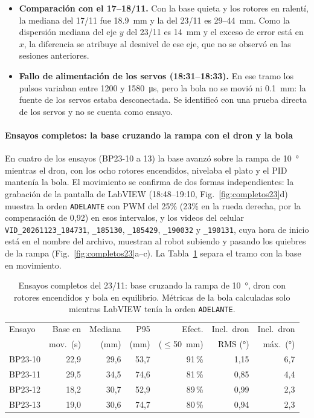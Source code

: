 \begin{itemize}
  \item \textbf{Comparación con el 17--18/11.} Con la base quieta y los rotores en ralentí, la mediana del 17/11 fue \SI{18.9}{\milli\metre} y la del 23/11 es 29--\SI{44}{\milli\metre}. Como la dispersión mediana del eje $y$ del 23/11 es \SI{14}{\milli\metre} y el exceso de error está en $x$, la diferencia se atribuye al desnivel de ese eje, que no se observó en las sesiones anteriores.
  \item \textbf{Fallo de alimentación de los servos (18:31--18:33).} En ese tramo los pulsos variaban entre 1200 y \SI{1580}{\micro\second}, pero la bola no se movió ni \SI{0.1}{\milli\metre}: la fuente de los servos estaba desconectada. Se identificó con una prueba directa de los servos y no se cuenta como ensayo.
\end{itemize}

\paragraph{Ensayos completos: la base cruzando la rampa con el dron y la bola} En cuatro de los ensayos (BP23-10 a 13) la base avanzó sobre la rampa de \SI{10}{\degree} mientras el dron, con los ocho rotores encendidos, nivelaba el plato y el PID mantenía la bola. El movimiento se confirma de dos formas independientes: la grabación de la pantalla de LabVIEW (18:48--19:10, Fig.~\ref{fig:completos23}d) muestra la orden \texttt{ADELANTE} con PWM del 25\% (23\% en la rueda derecha, por la compensación de 0,92) en esos intervalos, y los videos del celular \texttt{VID\_20261123\_184731}, \texttt{\_185130}, \texttt{\_185429}, \texttt{\_190032} y \texttt{\_190131}, cuya hora de inicio está en el nombre del archivo, muestran al robot subiendo y pasando los quiebres de la rampa (Fig.~\ref{fig:completos23}a--c). La Tabla~\ref{tab:completos23} separa el tramo con la base en movimiento.

\begin{table}[!htbp]
\centering
\caption{Ensayos completos del 23/11: base cruzando la rampa de \SI{10}{\degree}, dron con rotores encendidos y bola en equilibrio. Métricas de la bola calculadas solo mientras LabVIEW tenía la orden \texttt{ADELANTE}.}
\label{tab:completos23}
\small
\begin{tabular}{@{}lrrrrrr@{}}
\toprule
Ensayo & Base en & Mediana & P95 & Efect. & Incl.\ dron & Incl.\ dron \\
 & mov.\ (s) & (mm) & (mm) & ($\le$\SI{50}{\milli\metre}) & RMS (°) & máx.\ (°) \\
\midrule
BP23-10 & 22,9 & 29,6 & 53,7 & 91\,\% & 1,15 & 6,7 \\
BP23-11 & 29,5 & 34,5 & 74,6 & 81\,\% & 0,85 & 4,4 \\
BP23-12 & 18,2 & 30,7 & 52,9 & 89\,\% & 0,99 & 2,3 \\
BP23-13 & 19,0 & 30,6 & 74,7 & 80\,\% & 0,94 & 2,3 \\
\bottomrule
\end{tabular}
\end{table}

